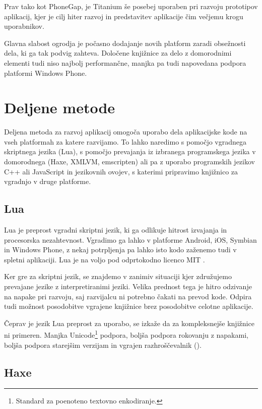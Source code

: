Prav tako kot PhoneGap, je Titanium še posebej uporaben pri razvoju prototipov aplikacij, kjer je cilj hiter razvoj in predstavitev aplikacije čim večjemu krogu uporabnikov.

Glavna slabost ogrodja je počasno dodajanje novih platform zaradi obsežnosti dela, ki ga tak podvig zahteva. Določene knjižnice za delo z domorodnimi elementi tudi niso najbolj performančne, manjka pa tudi napovedana podpora platformi Windows Phone.

\section{Deljene metode}

Deljena metoda za razvoj aplikacij omogoča uporabo dela aplikacijske kode na vseh platformah za katere razvijamo. To lahko naredimo s pomočjo vgradnega skriptnega jezika (Lua), s pomočjo prevajanja iz izbranega programskega jezika v domorodnega (Haxe, XMLVM, emscripten) ali pa z uporabo programskih jezikov C++ ali JavaScript in jezikovnih ovojev, s katerimi pripravimo knjižnico za vgradnjo v druge platforme.

\subsection{Lua}

Lua\cite{lua} je preprost vgradni skriptni jezik, ki ga odlikuje hitrost izvajanja in procesorska nezahtevnost. Vgradimo ga lahko v platforme Android, iOS, Symbian in Windows Phone, z nekaj potrpljenja pa lahko isto kodo zaženemo tudi v spletni aplikaciji. Lua je na voljo pod odprtokodno licenco MIT \cite{mit}.

Ker gre za skriptni jezik, se znajdemo v zanimiv situaciji kjer združujemo prevajane jezike z interpretiranimi jeziki. Velika prednost tega je hitro odzivanje na napake pri razvoju, saj razvijalcu ni potrebno čakati na prevod kode. Odpira tudi možnost posodobitve vgrajene knjižnice brez posodobitve celotne aplikacije.

Čeprav je jezik Lua preprost za uporabo, se izkaže da za kompleksnejše knjižnice ni primeren. Manjka Unicode\footnote{Standard za poenoteno textovno enkodiranje.} podpora, boljša podpora rokovanju z napakami, boljša podpora starejšim verzijam in vgrajen razhroščevalnik ().

\subsection{Haxe}

